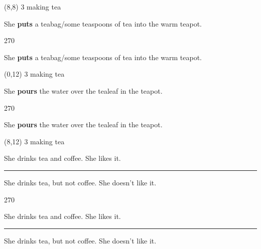 \documentclass[a4paper]{article}
\newenvironment{itemize*}%
{\begin{itemize}%
 \setlength{\itemsep}{0.0cm}%
 \setlength{\parsep}{0pt}%
 \setlength{\parskip}{0pt}}%
{\end{itemize}}
\newcommand{\mycard}[3]{%
	\small #1 #2
	\par
	\parbox[t][6.8cm][c]{9.5cm}{%
	\par
	\myleft{#3}
	\par
	\myright{#3}
	}
}
\newcommand{\myleft}[1]{%
	\begin{sideways}
	\hspace*{-0.9cm}
		\parbox[t][2.7cm][t]{6.5cm}{%
		\Large #1
		}
	\end{sideways}
}
\newcommand{\myright}[1]{%
	\hspace*{6.5cm}
	\begin{turn}{270}
	\hspace*{-7.1cm}
		\parbox[t][2.7cm][t]{6.5cm}{%
		\Large #1
		}
	\end{turn}
}
\begin{document}
\begin{textblock}{8}(8,8)
\mycard{3}{making tea}{
\begin{itemize*}
\item She \textbf{puts} a teabag/some teaspoons of tea into the warm teapot.
\end{itemize*}
}
\end{textblock}

\begin{textblock}{8}(0,12)
\mycard{3}{making tea}{
\begin{itemize*}
\item She \textbf{pours} the water over the tealeaf in the teapot.
\end{itemize*}
}
\end{textblock}

\begin{textblock}{8}(8,12)
\mycard{3}{making tea}{
\begin{itemize*}
\item * She drinks tea and coffee. She likes it.\hspace{-2.7cm} \rule[0.15cm]{2.5cm}{0.01cm}
\item * She drinks tea, but not coffee. She doesn't like it.
\end{itemize*}
}
\end{textblock}

\null
\newpage
\end{document}
